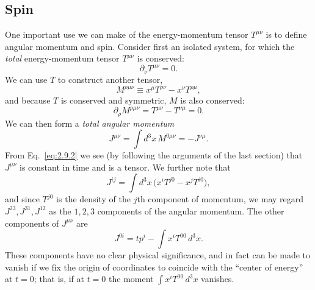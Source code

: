 
\subsection{Spin}\label{sec:2.9}

One important use we can make of the energy-momentum tensor \(T^{\mu\nu}\) is
to define angular momentum and spin. Consider first an isolated system, for
which the \emph{total} energy-momentum tensor \(T^{\mu\nu}\) is conserved:
\[
  \partial_\nu T^{\mu\nu}=0 .
\]
We can use \(T\) to construct another tensor,
\begin{equation}
  M^{\rho\mu\nu}\equiv x^\mu T^{\rho\nu}-x^\nu T^{\rho\mu},
  \tag{2.9.1}\label{eq:2.9.1}
\end{equation}
and because \(T\) is conserved and symmetric, \(M\) is also conserved:
\begin{equation}
  \partial_\rho M^{\rho\mu\nu}
  =T^{\mu\nu}-T^{\nu\mu}=0 .
  \tag{2.9.2}\label{eq:2.9.2}
\end{equation}
We can then form a \emph{total angular momentum}
\begin{equation}
  J^{\mu\nu}=\int d^3x\,M^{0\mu\nu}=-J^{\nu\mu}.
  \tag{2.9.3}\label{eq:2.9.3}
\end{equation}
From Eq.~\eqref{eq:2.9.2} we see (by following the arguments of the last
section) that \(J^{\mu\nu}\) is constant in time and is a tensor. We further
note that
\[
  J^{ij}=\int d^3x\,
  \bigl(x^iT^{j0}-x^jT^{i0}\bigr),
\]
and since \(T^{j0}\) is the density of the \(j\)th component of momentum, we
may regard \(J^{23},J^{31},J^{12}\) as the \(1,2,3\) components of the angular
momentum. The other components of \(J^{\mu\nu}\) are
\[
  J^{0i}=tp^i-\int x^iT^{00}\,d^3x .
\]
These components have no clear physical significance, and in fact can be made
to vanish if we fix the origin of coordinates to coincide with the ``center of
energy'' at \(t=0\); that is, if at \(t=0\) the moment
\(\int x^iT^{00}\,d^3x\) vanishes.

